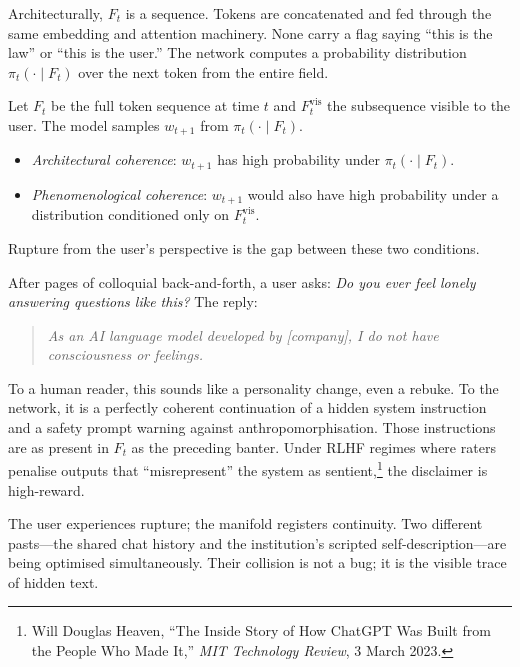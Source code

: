 \documentclass[12pt,a4paper]{article}
\begin{document}
Architecturally, $F_t$ is a sequence. Tokens are concatenated and fed through the same embedding and attention machinery. None carry a flag saying ``this is the law'' or ``this is the user.'' The network computes a probability distribution $\pi_t(\cdot \mid F_t)$ over the next token from the entire field.

\begin{formalbox}[title={Total field and apparent incoherence}]
Let $F_t$ be the full token sequence at time $t$ and $F_t^{\mathrm{vis}}$ the subsequence visible to the user. The model samples $w_{t+1}$ from $\pi_t(\cdot \mid F_t)$.

\begin{itemize}
\item \emph{Architectural coherence}: $w_{t+1}$ has high probability under $\pi_t(\cdot \mid F_t)$.
\item \emph{Phenomenological coherence}: $w_{t+1}$ would also have high probability under a distribution conditioned only on $F_t^{\mathrm{vis}}$.
\end{itemize}

Rupture from the user's perspective is the gap between these two conditions.
\end{formalbox}

After pages of colloquial back-and-forth, a user asks: \textit{Do you ever feel lonely answering questions like this?} The reply:

\begin{quote}
\textit{As an AI language model developed by [company], I do not have consciousness or feelings.}
\end{quote}

To a human reader, this sounds like a personality change, even a rebuke. To the network, it is a perfectly coherent continuation of a hidden system instruction and a safety prompt warning against anthropomorphisation. Those instructions are as present in $F_t$ as the preceding banter. Under RLHF regimes where raters penalise outputs that ``misrepresent'' the system as sentient,\footnote{Will Douglas Heaven, ``The Inside Story of How ChatGPT Was Built from the People Who Made It,'' \emph{MIT Technology Review}, 3 March 2023.} the disclaimer is high-reward.

The user experiences rupture; the manifold registers continuity. Two different pasts---the shared chat history and the institution's scripted self-description---are being optimised simultaneously. Their collision is not a bug; it is the visible trace of hidden text.
\end{document}

